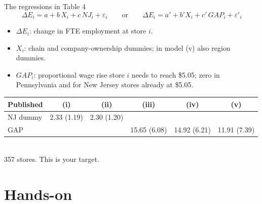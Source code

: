 \documentclass[aspectratio=169,11pt]{beamer}
\begin{document}
\begin{frame}{The regressions in Table 4}
\small
\[
\Delta E_i = a + b\,X_i + c\,\mathit{NJ}_i + \varepsilon_i
\qquad\text{or}\qquad
\Delta E_i = a' + b'X_i + c'\,\mathit{GAP}_i + \varepsilon'_i
\]
\begin{itemize}
\item $\Delta E_i$: change in FTE employment at store $i$.
\item $X_i$: chain and company-ownership dummies; in model (v) also region dummies.
\item $\mathit{GAP}_i$: proportional wage rise store $i$ needs to reach \$5.05; zero in Pennsylvania and for New Jersey stores already at \$5.05.
\end{itemize}
\begin{center}
\begin{tabular}{@{}lccccc@{}}
\toprule
Published & (i) & (ii) & (iii) & (iv) & (v)\\
\midrule
NJ dummy & 2.33 (1.19) & 2.30 (1.20) & & & \\
GAP & & & 15.65 (6.08) & 14.92 (6.21) & 11.91 (7.39)\\
\bottomrule
\end{tabular}\\[0.3em]
\footnotesize 357 stores. This is your target.
\end{center}
\end{frame}

\section{Hands-on}
\end{document}
